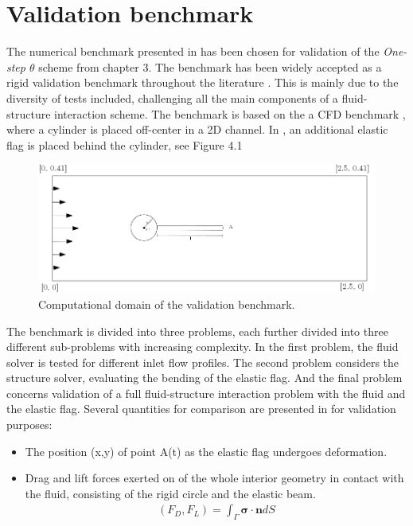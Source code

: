 \section{Validation benchmark}
The numerical benchmark presented in \cite{Hron2006} has been chosen for validation of the \textit{One-step $\theta$} scheme from chapter 3. The benchmark has been widely accepted as a rigid validation benchmark  throughout the literature \cite{Wickb, Wick, V2013, Gatzhammer2014}. This is mainly due to the diversity of tests included, challenging all the main components of a fluid-structure interaction scheme. The benchmark is based on the a CFD benchmark \cite{White}, where a cylinder is placed off-center in a 2D channel. In \cite{Hron2006}, an additional elastic flag is placed behind the cylinder, see Figure 4.1
\begin{figure}[h!]
  \centering
    \includegraphics[scale=0.2]{./Fig/turekflag.png}
      \caption{Computational domain of the validation benchmark.}
      \label{fig:tflag}
\end{figure}
The benchmark is divided into three problems, each further divided into three different sub-problems with increasing complexity. In the first problem, the fluid solver is tested for different inlet flow profiles. The second problem considers the structure solver, evaluating the bending of the elastic flag. And the final problem concerns validation of a full fluid-structure interaction problem with the fluid and the elastic flag.  Several quantities for comparison are presented in \cite{Hron2006} for validation purposes:
\begin{itemize}
\item The position (x,y) of point A(t) as the elastic flag undergoes deformation.
\item Drag and lift forces exerted on of the whole interior geometry in contact with the fluid, consisting of the rigid circle and the elastic beam.
\begin{align*}
(F_D, F_L) = \int_{\Gamma} \mathbf{\sigma} \cdot \mathbf{n} dS
\end{align*}
\end{itemize}
